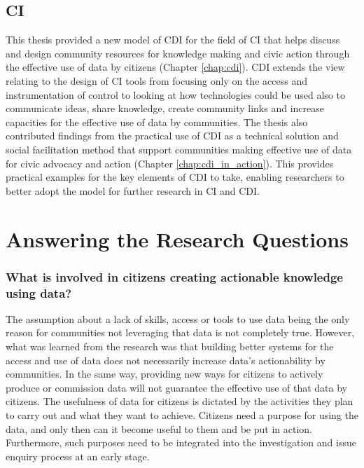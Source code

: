 \subsection{CI}
This thesis provided a new model of CDI for the field of CI that helps discuss and design community resources for knowledge making and civic action through the effective use of data by citizens (Chapter \ref{chap:cdi}). CDI extends the view relating to the design of CI tools from focusing only on the access and instrumentation of control \citep{stillman_community_2009} to looking at how technologies could be used also to communicate ideas, share knowledge, create community links and increase capacities for the effective use of data by communities. The thesis also contributed findings from the practical use of CDI as a technical solution and social facilitation method that support communities making effective use of data for civic advocacy and action (Chapter \ref{chap:cdi_in_action}). This provides practical examples for the key elements of CDI to take, enabling researchers to better adopt the model for further research in CI and CDI.

\section{Answering the Research Questions}
\subsubsection{What is involved in citizens creating actionable knowledge using data?}
The assumption about a lack of skills, access or tools to use data being the only reason for communities not leveraging that data is not completely true. However, what was learned from the research was that building better systems for the access and use of data does not necessarily increase data's actionability by communities. In the same way, providing new ways for citizens to actively produce or commission data will not guarantee the effective use of that data by citizens. The usefulness of data for citizens is dictated by the activities they plan to carry out and what they want to achieve. Citizens need a purpose for using the data, and only then can it become useful to them and be put in action. Furthermore, such purposes need to be integrated into the investigation and issue enquiry process at an early stage. 

